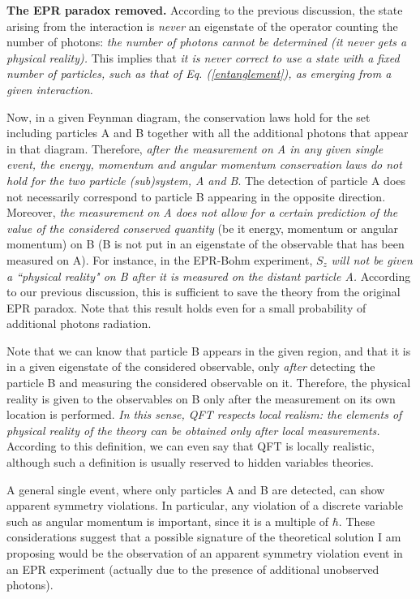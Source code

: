 \documentclass[aps,prl,showkeys,showpacs,preprint,groupedaddress]{revtex4}
\begin{document}
{\bf The EPR paradox removed.} According to the previous
discussion, the state arising from the interaction is {\it never}
an eigenstate of the operator counting the number of photons: {\it
the number of photons cannot be determined (it never gets a
physical reality).} This implies that {\it it is never correct to
use a state with a fixed number of particles, such as that of Eq.
(\ref{entanglement}), as emerging from a given interaction.}

Now, in a given Feynman diagram, the conservation laws hold for
the set including particles A and B together with all the
additional photons that appear in that diagram. Therefore, {\it
after the measurement on A in any given single event, the energy,
momentum and angular momentum conservation laws do not hold for
the two particle (sub)system, A and B}. The detection of particle
A does not necessarily correspond to particle B appearing in the
opposite direction. Moreover, {\it the measurement on A does not
allow for a certain prediction of the value of the considered
conserved quantity} (be it energy, momentum or angular momentum)
{on B (B is not put in an eigenstate of the observable that has
been measured on A).} For instance, in the EPR-Bohm experiment,
$S_z$ {\it will not be given a ``physical reality" on B after it
is measured on the distant particle A.} According to our previous
discussion, this is sufficient to save the theory from the
original EPR paradox. Note that this result holds even for a small
probability of additional photons radiation.

Note that we can know that particle B appears in the given region,
and that it is in a given eigenstate of the considered observable,
only {\it after} detecting the particle B and measuring the
considered observable on it. Therefore, the physical reality is
given to the observables on B only after the measurement on its
own location is performed. {\it In this sense, QFT respects local
realism: the elements of physical reality of the theory can be
obtained only after local measurements.} According to this
definition, we can even say that QFT is locally realistic,
although such a definition is usually reserved to hidden variables
theories.

A general single event, where only particles A and B are detected,
can show apparent symmetry violations. In particular, any
violation of a discrete variable such as angular momentum is
important, since it is a multiple of $\hbar$. These considerations
suggest that a possible signature of the theoretical solution I am
proposing would be the observation of an apparent symmetry
violation event in an EPR experiment (actually due to the presence
of additional unobserved photons).
\end{document}
